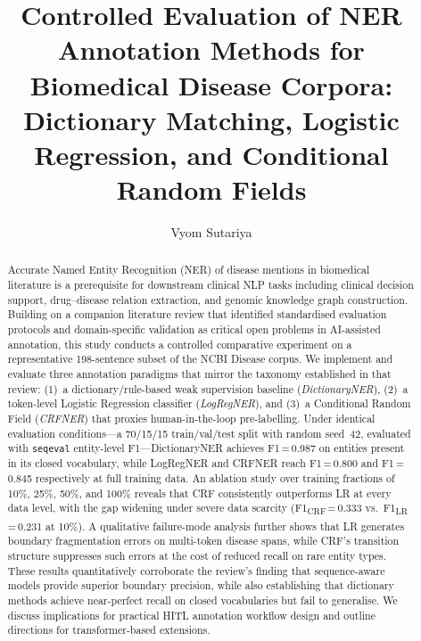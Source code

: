 \documentclass[sigconf,nonacm]{acmart}
\begin{document}
\title{Controlled Evaluation of NER Annotation Methods for Biomedical Disease Corpora:\\
Dictionary Matching, Logistic Regression, and Conditional Random Fields}

\author{Vyom Sutariya}

\begin{abstract}
Accurate Named Entity Recognition (NER) of disease mentions in biomedical literature is a prerequisite for downstream clinical NLP tasks including clinical decision support, drug--disease relation extraction, and genomic knowledge graph construction. Building on a companion literature review that identified standardised evaluation protocols and domain-specific validation as critical open problems in AI-assisted annotation, this study conducts a controlled comparative experiment on a representative 198-sentence subset of the NCBI Disease corpus. We implement and evaluate three annotation paradigms that mirror the taxonomy established in that review: (1)~a dictionary/rule-based weak supervision baseline (\emph{DictionaryNER}), (2)~a token-level Logistic Regression classifier (\emph{LogRegNER}), and (3)~a Conditional Random Field (\emph{CRFNER}) that proxies human-in-the-loop pre-labelling. Under identical evaluation conditions---a 70/15/15 train/val/test split with random seed~42, evaluated with \texttt{seqeval} entity-level F1---DictionaryNER achieves F1\,=\,0.987 on entities present in its closed vocabulary, while LogRegNER and CRFNER reach F1\,=\,0.800 and F1\,=\,0.845 respectively at full training data. An ablation study over training fractions of 10\%, 25\%, 50\%, and 100\% reveals that CRF consistently outperforms LR at every data level, with the gap widening under severe data scarcity (F1\textsubscript{CRF}\,=\,0.333 vs.\ F1\textsubscript{LR}\,=\,0.231 at 10\%). A qualitative failure-mode analysis further shows that LR generates boundary fragmentation errors on multi-token disease spans, while CRF's transition structure suppresses such errors at the cost of reduced recall on rare entity types. These results quantitatively corroborate the review's finding that sequence-aware models provide superior boundary precision, while also establishing that dictionary methods achieve near-perfect recall on closed vocabularies but fail to generalise. We discuss implications for practical HITL annotation workflow design and outline directions for transformer-based extensions.
\end{abstract}
\end{document}
